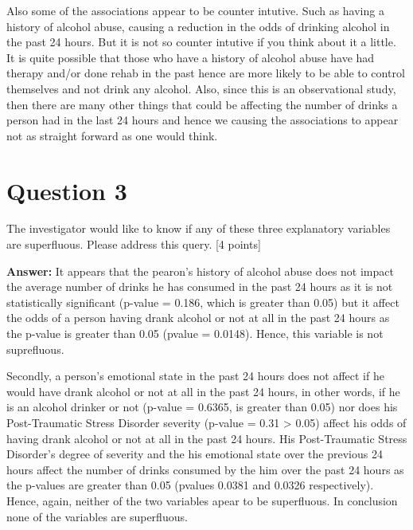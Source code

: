 \documentclass{article}\usepackage[]{graphicx}\usepackage[]{color}
\begin{document}
\vspace{5mm}

Also some of the associations appear to be counter intutive. Such as having a history of alcohol abuse, causing a reduction in the odds of drinking alcohol in the past 24 hours. But it is not so counter intutive if you think about it a little. It is quite possible that those who have a history of alcohol abuse have had therapy and/or done rehab in the past hence are more likely to be able to control themselves and not drink any alcohol. Also, since this is an observational study, then there are many other things that could be affecting the number of drinks a person had in the last 24 hours and hence we causing the associations to appear not as straight forward as one would think. 


\section*{Question 3}

The investigator would like to know if any of these three explanatory variables
are superfluous. Please address this query. [4 points]

\vspace{5mm}

{\bf Answer:} It appears that the pearon's history of alcohol abuse does not impact the average number of drinks he has consumed in the past 24 hours as it is not statistically significant (p-value = 0.186, which is greater than 0.05) but it affect the odds of a person having drank alcohol or not at all in the past 24 hours as the p-value is greater than 0.05 (pvalue = 0.0148). Hence, this variable is not suprefluous.


\vspace{5mm}

Secondly, a person's emotional state in the past 24 hours does not affect if he would have drank alcohol or not at all in the past 24 hours, in other words, if he is an alcohol drinker or not (p-value = 0.6365, is greater than 0.05) nor does his Post-Traumatic Stress Disorder severity (p-value = 0.31 > 0.05) affect his odds of having drank alcohol or not at all in the past 24 hours.  His Post-Traumatic Stress Disorder's degree of severity and the his emotional state over the previous 24 hours affect the number of drinks consumed by the him over the past 24 hours as the p-values are greater than 0.05 (pvalues 0.0381 and 0.0326 respectively). Hence, again, neither of the two variables apear to be superfluous. In conclusion none of the variables are superfluous. 
\end{document}
